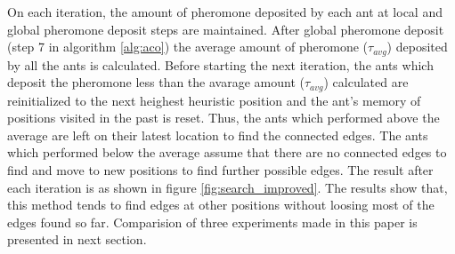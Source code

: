 \documentclass{llncs}
\begin{document}
	On each iteration, the amount of pheromone deposited by each ant at local and global pheromone deposit steps are maintained. After global pheromone deposit (step 7 in algorithm \ref{alg:aco}) the average amount of pheromone ($\tau_{avg}$) deposited by all the ants is calculated. Before starting the next iteration, the ants which deposit the pheromone less than the avarage amount ($\tau_{avg}$) calculated are reinitialized to the next heighest heuristic position and the ant's memory of positions visited in the past is reset. Thus, the ants which performed above the average are left on their latest location to find the connected edges. The ants which performed below the average assume that there are no connected edges to find and move to new positions to find further possible edges. The result after each iteration is as shown in figure \ref{fig:search_improved}. The results show that, this method tends to find edges at other positions without loosing most of the edges found so far. Comparision of three experiments made in this paper is presented in next section.
		
\end{document}
